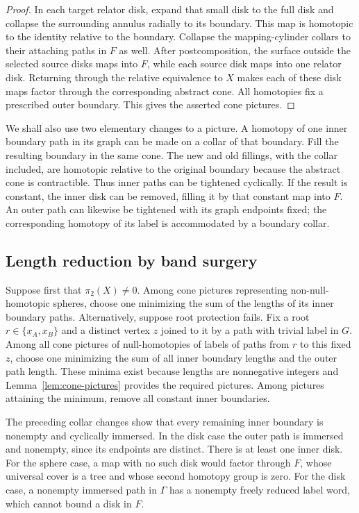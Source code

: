 \begin{proof}
In each target relator disk, expand that small disk to the full disk
and collapse the surrounding annulus radially to its boundary.  This
map is homotopic to the identity relative to the boundary.  Collapse
the mapping-cylinder collars to their attaching paths in $F$ as well.
After postcomposition, the surface outside the selected source disks
maps into $F$, while each source disk maps into one relator disk.
Returning through the relative equivalence to $X$ makes each of these
disk maps factor through the corresponding abstract cone.  All
homotopies fix a prescribed outer boundary.  This gives the asserted
cone pictures.
\end{proof}

We shall also use two elementary changes to a picture.  A homotopy of
one inner boundary path in its graph can be made on a collar of that
boundary.  Fill the resulting boundary in the same cone.  The new and
old fillings, with the collar included, are homotopic relative to the
original boundary because the abstract cone is contractible.  Thus
inner paths can be tightened cyclically.  If the result is constant,
the inner disk can be removed, filling it by that constant map into
$F$.  An outer path can likewise be tightened with its graph endpoints
fixed; the corresponding homotopy of its label is accommodated by a
boundary collar.

\subsection{Length reduction by band surgery}

Suppose first that $\pi_2(X)\ne0$.  Among cone pictures representing
non-null-homotopic spheres, choose one minimizing the sum of the lengths
of its inner boundary paths.  Alternatively, suppose root protection
fails.  Fix a root $r\in\{x_A,x_B\}$ and a distinct vertex $z$ joined
to it by a path with trivial label in $G$.  Among all cone pictures of
null-homotopies of labels of paths from $r$ to this fixed $z$, choose
one minimizing the sum of all inner boundary lengths and the outer
path length.  These minima exist because lengths are nonnegative
integers and Lemma~\ref{lem:cone-pictures} provides the required
pictures.  Among pictures attaining the minimum, remove all constant
inner boundaries.

The preceding collar changes show that every remaining inner boundary
is nonempty and cyclically immersed.  In the disk case the outer path
is immersed and nonempty, since its endpoints are distinct.  There is
at least one inner disk.  For the sphere case, a map with no such disk
would factor through $F$, whose universal cover is a tree and whose
second homotopy group is zero.  For the disk case, a nonempty immersed
path in $\Gamma$ has a nonempty freely reduced label word, which
cannot bound a disk in $F$.

